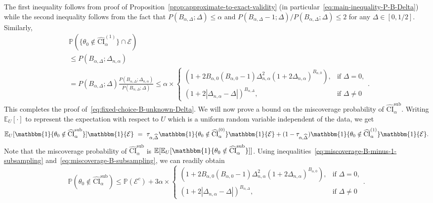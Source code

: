 \documentclass{article}
\numberwithin{myalgctr}{section}
\begin{document}
The first inequality follows from proof of Proposition~\ref{prop:approximate-to-exact-validity} (in particular~\eqref{eq:main-inequality-P-B-Delta}) while the second inequality follows from the fact that $P(B_{\alpha,\Delta}; \Delta) \le \alpha$ and $P(B_{\alpha,\Delta} - 1; \Delta)/P(B_{\alpha,\Delta}; \Delta) \le 2$ for any $\Delta\in[0, 1/2]$. Similarly,
\begin{equation}\label{eq:miscoverage-B-subsampling}
\begin{split}
&\mathbb{P}(\{\theta_0 \notin \widehat{\mathrm{CI}}_{\alpha}^{(1)}\}\cap\mathcal{E})\\
&\le P(B_{\alpha,\Delta}; \Delta_{n,\alpha})\\ 
&= P(B_{\alpha,\Delta}; \Delta)\frac{P(B_{\alpha,\Delta}; \Delta_{n,\alpha})}{P(B_{\alpha,\Delta}; \Delta)} \le \alpha\times\begin{cases}(1 + 2B_{\alpha,0}(B_{\alpha,0} - 1)\Delta_{n,\alpha}^2(1 + 2\Delta_{n,\alpha})^{B_{\alpha,0}}), &\mbox{if }\Delta = 0,\\
(1 + 2|\Delta_{n,\alpha} - \Delta|)^{B_{\alpha,\Delta}}, &\mbox{if }\Delta \neq 0\end{cases}.
\end{split}
\end{equation}
This completes the proof of~\eqref{eq:fixed-choice-B-unknown-Delta}. 
We will now prove a bound on the miscoverage probability of $\widehat{\mathrm{CI}}_{\alpha}^{\mathrm{sub}}$.
Writing $\mathbb{E}_{U}[\cdot]$ to represent the expectation with respect to $U$ which is a uniform random variable independent of the data, we get
\begin{equation}\label{eq:miscoverage-subsampling}
\mathbb{E}_U[\mathbbm{1}\{\theta_0 \notin \widehat{\mathrm{CI}}_{\alpha}^{\mathrm{sub}}\}]\mathbbm{1}\{\mathcal{E}\} ~=~ \tau_{\alpha,\widehat{\Delta}}\mathbbm{1}\{\theta_0 \notin \widehat{\mathrm{CI}}_{\alpha}^{(0)}\}\mathbbm{1}\{\mathcal{E}\} + (1 - \tau_{\alpha,\widehat{\Delta}})\mathbbm{1}\{\theta_0 \notin \widehat{\mathrm{CI}}_{\alpha}^{(1)}\}\mathbbm{1}\{\mathcal{E}\}.
\end{equation}
Note that the miscoverage probability of $\widehat{\mathrm{CI}}_{\alpha}^{\mathrm{sub}}$ is $\mathbb{E}[\mathbb{E}_{U}[\mathbbm{1}\{\theta_0 \notin \widehat{\mathrm{CI}}_{\alpha}^{\mathrm{sub}}\}]]$. Using inequalities~\eqref{eq:miscoverage-B-minus-1-subsampling} and~\eqref{eq:miscoverage-B-subsampling}, we can readily obtain
\[
\mathbb{P}(\theta_0 \notin \widehat{\mathrm{CI}}_{\alpha}^{\mathrm{sub}}) \le \mathbb{P}(\mathcal{E}^c) + 3\alpha\times\begin{cases}(1 + 2B_{\alpha,0}(B_{\alpha,0} - 1)\Delta_{n,\alpha}^2(1 + 2\Delta_{n,\alpha})^{B_{\alpha,0}}), &\mbox{if }\Delta = 0,\\
(1 + 2|\Delta_{n,\alpha} - \Delta|)^{B_{\alpha,\Delta}}, &\mbox{if }\Delta \neq 0\end{cases}.
\]
\end{document}
